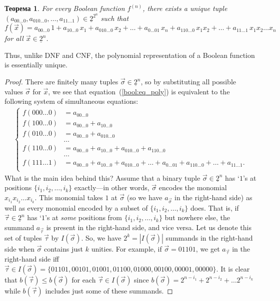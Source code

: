 \documentclass[12pt,notitlepage]{article}
\theoremstyle{plain}
\newtheorem{thm}{Теорема}[section]
\theoremstyle{definition}
\theoremstyle{plain}
\newcommand{\ul}[1]{\underline{#1}}
\newcommand{\1}{\mathbf{1}}
\newcommand{\0}{\mathbf{0}}
\begin{document}
\begin{thm}\label{bool:zhegalkin}
	For every Boolean function $f^{(n)}$, there exists a unique tuple $(a_{00\ldots0}, a_{010\ldots0}, \ldots, a_{11\ldots1}) \in \ul{2}^{2^n}$ such that
	\begin{equation}\label{bool:eq_poly}
		f(\vec x) = a_{00\ldots0}\, 1 + a_{10\ldots0}\, x_1 + a_{010\ldots0}\, x_2 + \ldots + a_{0\ldots01}\, x_n + a_{110\ldots0}\, x_1 x_2 + \ldots + a_{11\ldots 1}\, x_1 x_2\ldots x_n
	\end{equation}
	for all $\vec x \in \ul{2}^n$.
\end{thm}
Thus, unlike DNF and CNF, the polynomial representation of a Boolean function is essentially unique.
\begin{proof}
	There are finitely many tuples $\vec \sigma \in \ul{2}^n$, so by substituting all possible values $\vec \sigma$ for $\vec x$, we see that equation~(\ref{bool:eq_poly}) is equivalent to the following system of simultaneous equations:
	\begin{equation}\label{bool:eq_sle}
		\begin{array}{l}
			\begin{cases}
				f(000\ldots0) &= a_{00\ldots0}\\
				f(100\ldots0) &= a_{00\ldots0} + a_{10\ldots0}\\
				f(010\ldots0) &= a_{00\ldots0} + a_{010\ldots0}\\
				&\ldots\\
				f(110\ldots0) &= a_{00\ldots0} + a_{10\ldots0} + a_{010\ldots0} + a_{110\ldots0}\\
				&\ldots\\
				f(111\ldots1) &= a_{00\ldots0} + a_{10\ldots0} + a_{010\ldots0} + \ldots + a_{0\ldots01} + a_{110\ldots0} + \ldots + a_{11\ldots 1}.\\
			\end{cases}
		\end{array}
	\end{equation}
	What is the main idea behind this? Assume that a binary tuple $\vec \sigma \in \ul{2}^n$ has `$1$'s at positions $\{i_1, i_2, \ldots, i_k\}$ exactly---in other words, $\vec \sigma$ encodes the monomial $x_{i_1} x_{i_2} \ldots x_{i_k}$. This monomial takes $1$ at $\vec\sigma$ (so we have $a_{\vec \sigma}$ in the right-hand side) as well as every monomial encoded by a subset of $\{i_1, i_2, \ldots, i_k\}$ does. That is, if $\vec \tau \in \ul{2}^n$ has `$1$'s at \emph{some} positions from $\{i_1, i_2, \ldots, i_k\}$ but nowhere else, the summand $a_{\vec \tau}$ is present in the right-hand side, and vice versa. Let us denote this set of tuples $\vec \tau$ by $I(\vec \sigma)$. So, we have $2^k = |I(\vec \sigma)|$ summands in the right-hand side when $\vec \sigma$ contains just $k$ unities. For example, if $\vec \sigma = 01101$, we get $a_{\vec \tau}$ in the right-hand side iff $\vec\tau \in I(\vec{\sigma}) = \{01101, 00101, 01001, 01100, 01000, 00100, 00001, 00000\}$. It is clear that $b(\vec \tau) \leq b(\vec \sigma)$ for each $\vec \tau \in I(\vec \sigma)$ since $b(\vec \sigma) = 2^{n - i_1} + 2^{n - i_2} + \ldots 2^{n - i_k}$ while $b(\vec \tau)$ includes just some of these summands.
	

\end{proof}
\end{document}
